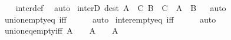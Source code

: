 \begin{isabellebody}
%
\isadelimproof
\ \ %
\endisadelimproof
%
\isatagproof
{}\isamarkupfalse%
\ inter{\isacharunderscore}{\kern0pt}def\ \isamarkupfalse%
\ auto%
\endisatagproof
{\isafoldproof}%
%
\isadelimproof
\isanewline
%
\endisadelimproof
\isanewline
\isanewline
{}\isamarkupfalse%
\ interD\ {\isacharbrackleft}{\kern0pt}dest{\isacharbrackright}{\kern0pt}{\isacharcolon}{\kern0pt}\ {\isachardoublequoteopen}{\isasymlbrakk}A\ {\isasymin}\ {\isasymInter}C{\isacharsemicolon}{\kern0pt}\ B\ {\isasymin}\ C{\isasymrbrakk}\ {\isasymLongrightarrow}\ A\ {\isasymin}\ B{\isachardoublequoteclose}%
\isadelimproof
\ %
\endisadelimproof
%
\isatagproof
{}\isamarkupfalse%
\ auto%
\endisatagproof
{\isafoldproof}%
%
\isadelimproof
%
\endisadelimproof
\isanewline
\isanewline
{}\isamarkupfalse%
\ union{\isacharunderscore}{\kern0pt}empty{\isacharunderscore}{\kern0pt}eq\ {\isacharbrackleft}{\kern0pt}iff{\isacharbrackright}{\kern0pt}{\isacharcolon}{\kern0pt}\ {\isachardoublequoteopen}{\isasymUnion}{\isacharbraceleft}{\kern0pt}{\isacharbraceright}{\kern0pt}\ {\isacharequal}{\kern0pt}\ {\isacharbraceleft}{\kern0pt}{\isacharbraceright}{\kern0pt}{\isachardoublequoteclose}%
\isadelimproof
\ %
\endisadelimproof
%
\isatagproof
{}\isamarkupfalse%
\ auto%
\endisatagproof
{\isafoldproof}%
%
\isadelimproof
%
\endisadelimproof
\isanewline
\isanewline
{}\isamarkupfalse%
\ inter{\isacharunderscore}{\kern0pt}empty{\isacharunderscore}{\kern0pt}eq\ {\isacharbrackleft}{\kern0pt}iff{\isacharbrackright}{\kern0pt}{\isacharcolon}{\kern0pt}\ {\isachardoublequoteopen}{\isasymInter}{\isacharbraceleft}{\kern0pt}{\isacharbraceright}{\kern0pt}\ {\isacharequal}{\kern0pt}\ {\isacharbraceleft}{\kern0pt}{\isacharbraceright}{\kern0pt}{\isachardoublequoteclose}%
\isadelimproof
\ %
\endisadelimproof
%
\isatagproof
{}\isamarkupfalse%
\ auto%
\endisatagproof
{\isafoldproof}%
%
\isadelimproof
%
\endisadelimproof
\isanewline
\isanewline
{}\isamarkupfalse%
\ union{\isacharunderscore}{\kern0pt}eq{\isacharunderscore}{\kern0pt}empty{\isacharunderscore}{\kern0pt}iff{\isacharcolon}{\kern0pt}\ {\isachardoublequoteopen}{\isasymUnion}A\ {\isacharequal}{\kern0pt}\ {\isacharbraceleft}{\kern0pt}{\isacharbraceright}{\kern0pt}\ {\isasymlongleftrightarrow}\ A\ {\isacharequal}{\kern0pt}\ {\isacharbraceleft}{\kern0pt}{\isacharbraceright}{\kern0pt}\ {\isasymor}\ A\ {\isacharequal}{\kern0pt}\ {\isacharbraceleft}{\kern0pt}{\isacharbraceleft}{\kern0pt}{\isacharbraceright}{\kern0pt}{\isacharbraceright}{\kern0pt}{\isachardoublequoteclose}\isanewline

\end{isabellebody}
